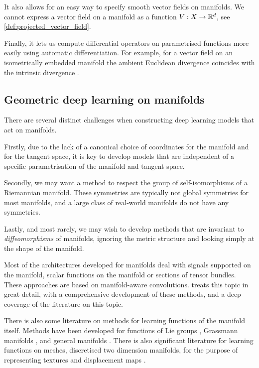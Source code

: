 It also allows for an easy way to specify smooth vector fields on manifolds.
We cannot express a vector field on a manifold as a function \(V:X \to \mathbb{R}^d\), see \cref{def:projected_vector_field}.

Finally, it lets us compute differential operators on parametrised functions more easily using automatic differentiation.
For example, for a vector field on an isometrically embedded manifold the ambient Euclidean divergence coincides with the intrinsic divergence \cite{rozen2021moser}.

\subsection{Geometric deep learning on manifolds}

There are several distinct challenges when constructing deep learning models that act on manifolds.

Firstly, due to the lack of a canonical choice of coordinates for the manifold and for the tangent space, it is key to develop models that are independent of a specific parametrisation of the manifold and tangent space.

Secondly, we may want a method to respect the group of self-isomorphisms of a Riemannian manifold.
These symmetries are typically not global symmetries for most manifolds, and a large class of real-world manifolds do not have any symmetries.

Lastly, and most rarely, we may wish to develop methods that are invariant to \emph{diffeomorphisms} of manifolds, ignoring the metric structure and looking simply at the shape of the manifold.

Most of the architectures developed for manifolds deal with signals supported on the manifold, scalar functions on the manifold or sections of tensor bundles.
These approaches are based on manifold-aware convolutions.
\textcite{weiler2023equivariant} treats this topic in great detail, with a comprehensive development of these methods, and a deep coverage of the literature on this topic.

There is also some literature on methods for learning functions of the manifold itself.
Methods have been developed for functions of Lie groups \cite{huang2017deep}, Grassmann manifolds \cite{huang2018building,zhang2018grassmannian}, and general manifolds \cite{fang2023intrinsic}.
There is also significant literature for learning functions on meshes, discretised two dimension manifolds, for the purpose of representing textures \cite{koestler2022intrinsic, baatz2022nerf, chibane2020implicit, oechsle2019texture} and displacement maps \cite{yifan2022geometryconsistentneuralshaperepresentation}.


